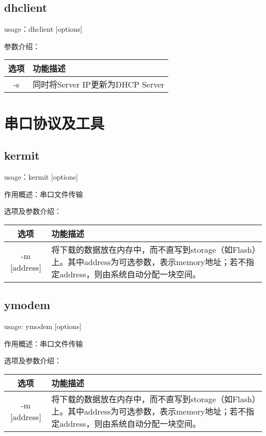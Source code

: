 \subsection{dhclient}
usage：dhclient [options]

参数介绍：
\begin{table}[H]
\setlength{\parindent}{0pt}
\begin{tabular}{|c|l|} \hline
选项 & 功能描述 \\ \hline
 -s & 同时将Server IP更新为DHCP Server \\ \hline
\end{tabular}
\end{table}

\section{串口协议及工具}

\subsection{kermit}
usage：kermit [options]

作用概述：串口文件传输%

选项及参数介绍：
\begin{table}[H]
\setlength{\parindent}{0pt}
\begin{tabular}{|c|m{10cm}|} \hline
选项 & 功能描述 \\ \hline
 -m [address] & 将下载的数据放在内存中，而不直写到storage（如Flash）上。其中address为可选参数，表示memory地址；若不指定address，则由系统自动分配一块空间。 \\ \hline
\end{tabular}
\end{table}

\subsection{ymodem}
usage: ymodem [options]

作用概述：串口文件传输%

选项及参数介绍：
\begin{table}[H]
\setlength{\parindent}{0pt}
\begin{tabular}{|c|m{10cm}|} \hline
选项 & 功能描述 \\ \hline
 -m [address] & 将下载的数据放在内存中，而不直写到storage（如Flash）上。其中address为可选参数，表示memory地址；若不指定address，则由系统自动分配一块空间。 \\ \hline
\end{tabular}
\end{table}

